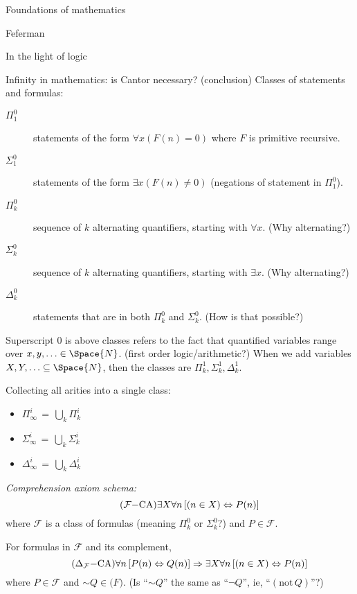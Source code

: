 \begin{plSection}{Foundations of mathematics}
\begin{plSection}{Feferman}
\begin{plSection}{In the light of logic}
\begin{plSection}{Infinity in mathematics: is Cantor necessary? (conclusion)}
Classes of statements and formulas:
\begin{description}
\item[$\Pi^0_1$] statements of the form
$\forall x (F(n) = 0)$ where $F$ is primitive recursive.
\item[$\Sigma^0_1$] statements of the form
$\exists x (F(n) \neq 0)$ (negations of statement in $\Pi^0_1$).
\item[$\Pi^0_k$] sequence of $k$ alternating quantifiers,
starting with $\forall x$.
\textsf{(Why alternating?)}
\item[$\Sigma^0_k$] sequence of $k$ alternating quantifiers,
starting with $\exists x$.
\textsf{(Why alternating?)}
\item[$\Delta^0_k$] statements that are in both $\Pi^0_k$
and $\Sigma^0_k$. 
\textsf{(How is that possible?)}
\end{description}
Superscript $0$ is above classes refers to the fact that
quantified variables range over $x,y,\ldots \in \Space{N}$.
\textsf{(first order logic/arithmetic?)}
When we add variables $X,Y,\ldots \subseteq \Space{N}$,
then the classes are $\Pi^1_k, \Sigma^1_k, \Delta^1_k$.

Collecting all arities into a single class:
\begin{itemize}
  \item $\Pi^i_{\infty} \, = \, \bigcup_k \Pi^i_k$
  \item $\Sigma^i_{\infty} \, = \, \bigcup_k \Sigma^i_k$
  \item $\Delta^i_{\infty} \, = \, \bigcup_k \Delta^i_k$
\end{itemize}

\textit{Comprehension axiom schema:}
\begin{equation}
\tag{$\mathcal{F}{-}\text{CA}$}
\exists X \forall n \left[ (n \in X) \Leftrightarrow P(n) \right]
\end{equation}
where $\mathcal{F}$ is a class of formulas 
\textsf{(meaning $\Pi^0_k$ or $\Sigma^0_k$?)}
and $P \in \mathcal{F}$.

For formulas in $\mathcal{F}$ and its complement,
\begin{equation}
\tag{$\Delta_{\mathcal{F}}{-}\text{CA}$}
\forall n \left[ P(n) \Leftrightarrow Q(n) \right]
\Rightarrow 
\exists X \forall n \left[ (n \in X) \Leftrightarrow P(n) \right]
\end{equation}
where $P \in \mathcal{F}$ and $\sim Q \in \mathcal(F)$.
\textsf{
(Is ``$\sim Q$'' the same as ``$\lnot Q$'', ie, 
``$(\text{not}\, Q)$''?)}


\end{plSection}
\end{plSection}
\end{plSection}
\end{plSection}
